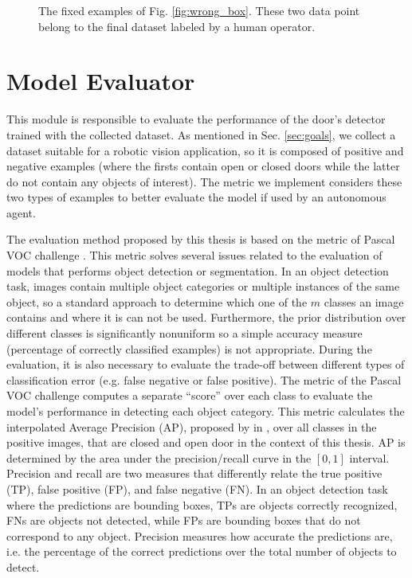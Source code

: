 \begin{figure}[h!]
	\caption{The fixed examples of Fig. \ref{fig:wrong_box}. These two data point belong to the final dataset labeled by a human operator.}
	\label{fig:correct_box}
\end{figure}

\section{Model Evaluator}
\label{sec:model_evaluator}
This module is responsible to evaluate the performance of the door's detector trained with the collected dataset. As mentioned in Sec. \ref{sec:goals}, we collect a dataset suitable for a robotic vision application, so it is composed of positive and negative examples (where the firsts contain open or closed doors while the latter do not contain any objects of interest). The metric we implement considers these two types of examples to better evaluate the model if used by an autonomous agent. 

The evaluation method proposed by this thesis is based on the metric of Pascal VOC challenge \cite{pascal}. This metric solves several issues related to the evaluation of models that performs object detection or segmentation. In an object detection task, images contain multiple object categories or multiple instances of the same object, so a standard approach to determine which one of the $m$ classes an image contains and where it is can not be used. Furthermore, the prior distribution over different classes is significantly nonuniform so a
simple accuracy measure (percentage of correctly classified
examples) is not appropriate. During the evaluation, it is also necessary
to evaluate the trade-off between different types of classification error (e.g. false negative or false positive). The metric of the Pascal VOC challenge computes a separate ``score'' over each class to evaluate the model's performance in detecting each object category.  This metric calculates the interpolated Average Precision (AP), proposed by \citeauthor{averageprecision} in \cite{averageprecision}, over all classes in the positive images, that are closed and open door in the context of this thesis. AP is determined by the area under the precision/recall curve in the $[0, 1]$ interval. Precision and recall are two measures that differently relate the true positive (TP), false positive (FP), and false negative (FN). In an object detection task where the predictions are bounding boxes, TPs are objects correctly recognized, FNs are objects not detected, while FPs are bounding boxes that do not correspond to any object. Precision measures how accurate the predictions are, i.e. the percentage of the correct predictions over the total number of objects to detect.

